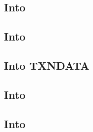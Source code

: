 \subsection{Into \hubMod{}}              \label{rlptxn: lookup: into HUB}                
\subsection{Into \romMod{}}              \label{rlptxn: lookup: into ROM}                
\subsection{Into TXNDATA}          \label{rlptxn: lookup: into TXN_DATA}           
\subsection{Into \rlpUtilsMod{}}         \label{rlptxn: lookup: into RLP_UTILS}          
\subsection{Into \trmMod{}}              \label{rlptxn: lookup: into TRM}                
